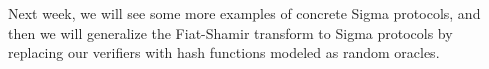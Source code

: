 \documentclass[12pt]{article}
\newtheorem{exercise}{Exercise}
\newtheorem{reading}{Reading}
\theoremstyle{definition}
\theoremstyle{remark}
\theoremstyle{definition}
\begin{document}
Next week, we will see some more examples of concrete Sigma protocols, and then we will generalize the Fiat-Shamir transform to Sigma protocols by replacing our verifiers with hash functions modeled as random oracles.







\end{document}
